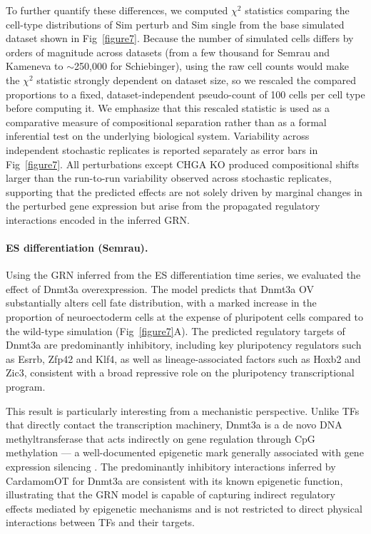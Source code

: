 \documentclass[a4paper, 11pt]{article}
\theoremstyle{plain}
\theoremstyle{remark}
\newcommand*{\firstreview}[1]{{\color{black}#1}}
\begin{document}
To further quantify these differences, we computed
$\chi^2$ statistics comparing the cell-type distributions of Sim perturb and Sim single
from the base simulated dataset shown in Fig~\ref{figure7}.
Because the number of simulated cells differs by orders of magnitude across datasets
(from a few thousand for Semrau and Kameneva to $\sim$250{,}000 for Schiebinger),
using the raw cell counts would make the $\chi^2$ statistic strongly dependent on dataset
size, so we rescaled the compared proportions to a fixed, dataset-independent
pseudo-count of 100 cells per cell type before computing it. We emphasize that this rescaled statistic is used as a comparative measure of
compositional separation rather than as a formal inferential test on the underlying
biological system.
Variability across independent stochastic replicates is reported separately as
error bars in Fig~\ref{figure7}.
All perturbations except CHGA KO produced compositional shifts larger than the run-to-run variability observed across stochastic replicates, supporting that the
predicted effects are not solely driven by marginal changes in the perturbed gene expression
but arise from the propagated regulatory interactions encoded in the inferred GRN.


\paragraph{ES differentiation (Semrau).}
Using the GRN inferred from the ES differentiation time series, we evaluated 
the effect of {Dnmt3a} overexpression. The model predicts that {Dnmt3a} 
OV substantially alters cell fate distribution, with a marked increase in the 
proportion of neuroectoderm cells at the expense of pluripotent cells compared 
to the wild-type simulation (Fig~\ref{figure7}A). The predicted regulatory 
targets of {Dnmt3a} are predominantly inhibitory, including key pluripotency 
regulators such as {Esrrb}, {Zfp42} and {Klf4}, as well as 
lineage-associated factors such as {Hoxb2} and {Zic3}, consistent 
with a broad repressive role on the pluripotency transcriptional program.

This result is particularly interesting from a mechanistic perspective. Unlike 
\firstreview{TFs} that directly contact the transcription machinery, {Dnmt3a} 
is a de novo DNA methyltransferase that acts indirectly on gene regulation through 
CpG methylation — a well-documented epigenetic mark generally associated with 
gene expression silencing \cite{bird2002dna}. The predominantly inhibitory interactions 
inferred by CardamomOT for {Dnmt3a} are consistent with its known epigenetic 
function, illustrating that the GRN model is capable of capturing indirect 
regulatory effects mediated by epigenetic mechanisms and is not restricted to 
direct physical interactions between \firstreview{TFs} and their targets.
\end{document}
